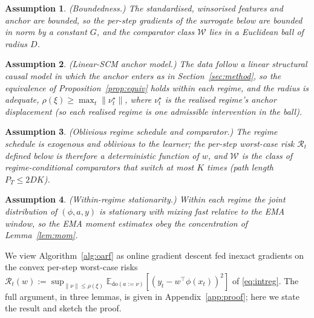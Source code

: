 \documentclass[11pt]{article}
\theoremstyle{plain}
\newtheorem{assumption}{Assumption}
\theoremstyle{remark}
\newcommand{\E}{\mathbb{E}}
\newcommand{\doop}{\mathrm{do}}
\begin{document}
\begin{assumption}\label{ass:bounded} (Boundedness.) The standardised, winsorised
features and anchor are bounded, so the per-step gradients of the surrogate below are
bounded in norm by a constant $G$, and the comparator class $\mathcal{W}$ lies in a
Euclidean ball of radius $D$.
\end{assumption}
\begin{assumption}\label{ass:scm} (Linear-SCM anchor model.) The data follow a linear
structural causal model in which the anchor enters as in Section~\ref{sec:method},
so the equivalence of Proposition~\ref{prop:equiv} holds within each regime, and the
radius is adequate, $\rho(\xi)\ge\max_t\|\nu_t^\star\|$, where $\nu_t^\star$ is the
realised regime's anchor displacement (so each realised regime is one admissible
intervention in the ball).
\end{assumption}
\begin{assumption}\label{ass:comp} (Oblivious regime schedule and comparator.) The
regime schedule is exogenous and oblivious to the learner; the per-step worst-case
risk $\mathcal{R}_t$ defined below is therefore a deterministic function of $w$, and
$\mathcal{W}$ is the class of regime-conditional comparators that switch at most $K$
times (path length $P_T\le 2DK$).
\end{assumption}
\begin{assumption}\label{ass:moment} (Within-regime stationarity.) Within each regime
the joint distribution of $(\phi,a,y)$ is stationary with mixing fast relative to the
EMA window, so the EMA moment estimates obey the concentration of Lemma~\ref{lem:mom}.
\end{assumption}

We view Algorithm~\ref{alg:oarf} as online gradient descent fed inexact gradients on
the convex per-step worst-case risks
$\mathcal{R}_t(w):=\sup_{\|\nu\|\le\rho(\xi)}\E_{\doop(a:=\nu)}[(y_t-w^\top\phi(x_t))^2]$
of \eqref{eq:intreg}. The full argument, in three lemmas, is given in
Appendix~\ref{app:proof}; here we state the result and sketch the proof.
\end{document}
